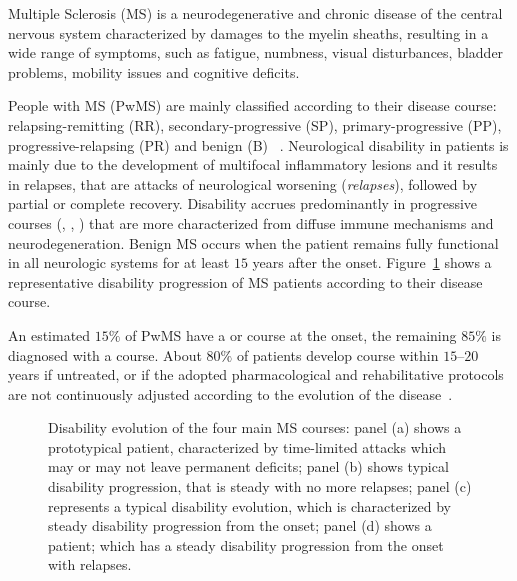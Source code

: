 Multiple Sclerosis (MS) is a neurodegenerative and chronic disease of the central nervous system characterized by damages to the myelin sheaths, resulting in a wide range of symptoms, such as fatigue, numbness, visual disturbances, bladder problems, mobility issues and cognitive deficits.


People with MS (PwMS) are mainly classified according to their disease course:
relapsing-remitting (\ac{RR}), secondary-progressive (\ac{SP}), primary-progressive (\ac{PP}), progressive-relapsing (\ac{PR}) and benign (\ac{B})~\cite{giovannoni2016brain} .
Neurological disability in \RR patients is mainly due to the development of multifocal inflammatory lesions and it results in relapses, that are attacks of neurological worsening (\ie \textit{relapses}), followed by partial or complete recovery. Disability accrues predominantly in progressive courses (\SP, \PP, \PR) that are more characterized from diffuse immune mechanisms and neurodegeneration.
Benign MS occurs when the patient remains fully functional in all neurologic systems for at least $15$ years after the onset.
Figure~\ref{fig:ms_mock} shows a representative disability progression of MS patients according to their disease course.

An estimated $15\%$ of PwMS have a \PP or \PR course at the onset, the remaining $85\%$ is diagnosed with a \RR course.
About $80\%$ of \RR patients develop \SP course within $15\text{--}20$ years if untreated, or if the adopted pharmacological and rehabilitative protocols are not continuously adjusted according to the evolution of the disease~\cite{scalfari2014onset}.

\begin{figure}[]
	\centering
	\hfill
	\caption{Disability evolution of the four main MS courses: panel (a) shows a prototypical \RR patient, characterized by time-limited attacks which may or may not leave permanent deficits; panel (b) shows \SP typical disability progression, that is steady with no more relapses; panel (c) represents a typical \PR disability evolution, which is characterized by steady disability progression from the onset; panel (d) shows a \PR patient; which has a steady disability progression from the onset with relapses.} \label{fig:ms_mock}
\end{figure}


